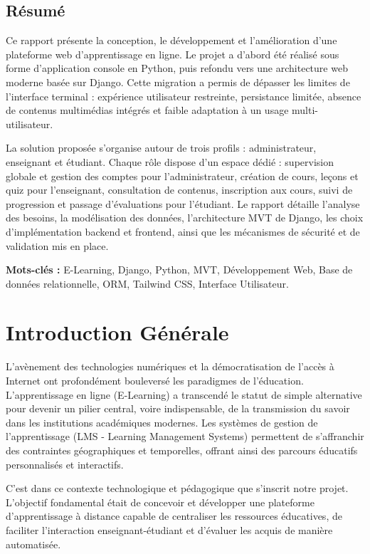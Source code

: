 \documentclass[12pt,a4paper]{report}
\begin{document}
\newpage
\section*{Résumé}
Ce rapport présente la conception, le développement et l'amélioration d'une plateforme web d'apprentissage en ligne. Le projet a d'abord été réalisé sous forme d'application console en Python, puis refondu vers une architecture web moderne basée sur Django. Cette migration a permis de dépasser les limites de l'interface terminal : expérience utilisateur restreinte, persistance limitée, absence de contenus multimédias intégrés et faible adaptation à un usage multi-utilisateur.

La solution proposée s'organise autour de trois profils : administrateur, enseignant et étudiant. Chaque rôle dispose d'un espace dédié : supervision globale et gestion des comptes pour l'administrateur, création de cours, leçons et quiz pour l'enseignant, consultation de contenus, inscription aux cours, suivi de progression et passage d'évaluations pour l'étudiant. Le rapport détaille l'analyse des besoins, la modélisation des données, l'architecture MVT de Django, les choix d'implémentation backend et frontend, ainsi que les mécanismes de sécurité et de validation mis en place.

\vspace{10pt}
\textbf{Mots-clés :} E-Learning, Django, Python, MVT, Développement Web, Base de données relationnelle, ORM, Tailwind CSS, Interface Utilisateur.

\newpage
\tableofcontents
\listoffigures
\listoftables

\newpage
\chapter*{Introduction Générale}

L'avènement des technologies numériques et la démocratisation de l'accès à Internet ont profondément bouleversé les paradigmes de l'éducation. L'apprentissage en ligne (E-Learning) a transcendé le statut de simple alternative pour devenir un pilier central, voire indispensable, de la transmission du savoir dans les institutions académiques modernes. Les systèmes de gestion de l'apprentissage (LMS - Learning Management Systems) permettent de s'affranchir des contraintes géographiques et temporelles, offrant ainsi des parcours éducatifs personnalisés et interactifs.

C'est dans ce contexte technologique et pédagogique que s'inscrit notre projet. L'objectif fondamental était de concevoir et développer une plateforme d'apprentissage à distance capable de centraliser les ressources éducatives, de faciliter l'interaction enseignant-étudiant et d'évaluer les acquis de manière automatisée.
\end{document}
